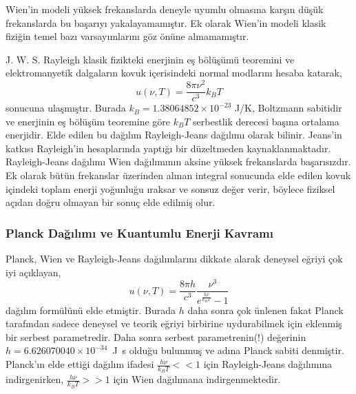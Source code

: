 \documentclass[a4paper,12pt, twoside]{article}
\begin{document}
Wien'in modeli yüksek frekanslarda deneyle uyumlu olmasına karşın düşük frekanslarda bu başarıyı yakalayamamıştır. Ek olarak Wien'in modeli klasik fiziğin temel bazı varsayımlarını göz önüne almamamıştır. 

J. W. S. Rayleigh klasik fizikteki enerjinin eş bölüşümü teoremini ve elektromanyetik dalgaların kovuk içerisindeki normal modlarını hesaba katarak,
%
\begin{equation}
\label{eq:Rayleigh}
u(\nu, T) = \frac{8 \pi \nu^{2}}{c^{3}} k_{B} T
\end{equation}
sonucuna ulaşmıştır. Burada $k_B = 1.38064852 \times 10^{-23}$ J/K, Boltzmann sabitidir ve enerjinin eş bölüşüm teoremine göre $k_B T$ serbestlik derecesi başına ortalama enerjidir. Elde edilen bu dağılım Rayleigh-Jeans dağılımı olarak bilinir. Jeans'in katkısı Rayleigh'in hesaplarında yaptığı bir düzeltmeden kaynaklanmaktadır. Rayleigh-Jeans dağılımı Wien dağılımının aksine yüksek frekanslarda başarısızdır. Ek olarak bütün frekanslar üzerinden alınan integral sonucunda elde edilen kovuk içindeki toplam enerji yoğunluğu ıraksar ve sonsuz değer verir, böylece fiziksel açıdan doğru olmayan bir sonuç elde edilmiş olur.






\subsubsection{Planck Dağılımı ve Kuantumlu Enerji Kavramı}

Planck, Wien ve Rayleigh-Jeans dağılımlarını dikkate alarak deneysel eğriyi çok iyi açıklayan,
\begin{equation}
\label{eq:Planck}
u(\nu, T) = \frac{8 \pi h}{c^{3}} \frac{\nu^{3}}{e^{\frac{h \nu}{k_{B} T}} - 1}
\end{equation} 
dağılım formülünü elde etmiştir. Burada $h$ daha sonra çok ünlenen fakat Planck tarafından sadece deneysel ve teorik eğriyi birbirine uydurabilmek için eklenmiş bir serbest parametredir. Daha sonra serbest parametrenin(!) değerinin $h=6.626070040 \times 10^{-34}$~J~s olduğu bulunmuş ve adına Planck sabiti denmiştir. Planck'ın elde ettiği dağılım ifadesi $\frac{h\nu}{k_B T}<<1$ için Rayleigh-Jeans dağılımına indirgenirken, $\frac{h\nu}{k_B T}>>1$ için Wien dağılımana indirgenmektedir.
\end{document}
